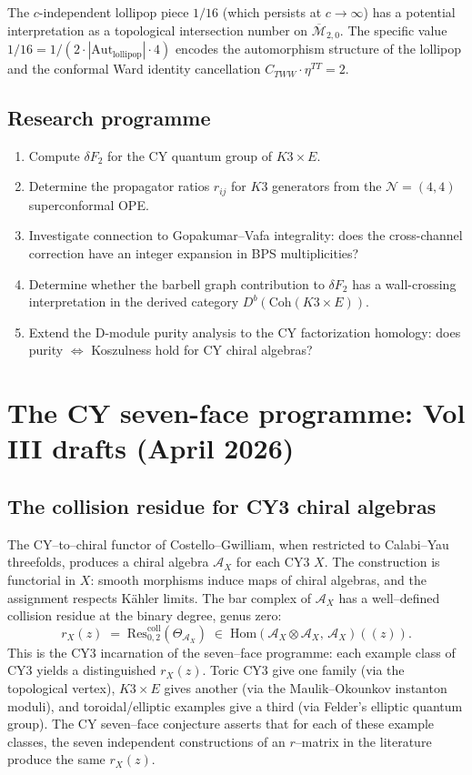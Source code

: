 \documentclass[11pt]{article}
\newcommand{\cA}{\mathcal{A}}
\newcommand{\cM}{\mathcal{M}}
\newcommand{\cN}{\mathcal{N}}
\begin{document}
The $c$-independent lollipop piece $1/16$ (which persists at
$c \to \infty$) has a potential interpretation as a topological
intersection number on $\overline{\cM}_{2,0}$. The specific value
$1/16 = 1/(2 \cdot |\mathrm{Aut}_{\mathrm{lollipop}}| \cdot 4)$
encodes the automorphism structure of the lollipop and the
conformal Ward identity cancellation $C_{TWW} \cdot \eta^{TT} = 2$.

\subsection{Research programme}

\begin{enumerate}
 \item Compute $\delta F_2$ for the CY quantum group of $K3 \times E$.
 \item Determine the propagator ratios $r_{ij}$ for $K3$ generators
 from the $\cN = (4,4)$ superconformal OPE.
 \item Investigate connection to Gopakumar--Vafa integrality: does
 the cross-channel correction have an integer expansion in BPS
 multiplicities?
 \item Determine whether the barbell graph contribution to
 $\delta F_2$ has a wall-crossing interpretation in the derived
 category $D^b(\mathrm{Coh}(K3 \times E))$.
 \item Extend the D-module purity analysis to the CY factorization
 homology: does purity $\Leftrightarrow$ Koszulness hold for CY
 chiral algebras?
\end{enumerate}


\section{The CY seven-face programme: Vol III drafts (April 2026)}
\label{sec:cy-seven-faces-vol3-drafts}


\subsection{The collision residue for CY3 chiral algebras}

The CY--to--chiral functor of Costello--Gwilliam, when restricted to
Calabi--Yau threefolds, produces a chiral algebra $\cA_X$ for each CY3 $X$.
The construction is functorial in $X$: smooth morphisms induce maps of
chiral algebras, and the assignment respects K\"ahler limits. The bar
complex of $\cA_X$ has a well--defined collision residue at the binary
degree, genus zero:
\[
 r_X(z) \;=\; \mathrm{Res}^{\mathrm{coll}}_{0,2}(\Theta_{\cA_X}) \;\in\;
 \mathrm{Hom}(\cA_X \otimes \cA_X,\, \cA_X)((z)).
\]
This is the CY3 incarnation of the seven--face programme: each example
class of CY3 yields a distinguished $r_X(z)$. Toric CY3 give one family
(via the topological vertex), $K3 \times E$ gives another (via the
Maulik--Okounkov instanton moduli), and toroidal/elliptic examples give a
third (via Felder's elliptic quantum group). The CY seven--face conjecture
asserts that for each of these example classes, the seven independent
constructions of an $r$--matrix in the literature produce the same
$r_X(z)$.
\end{document}
